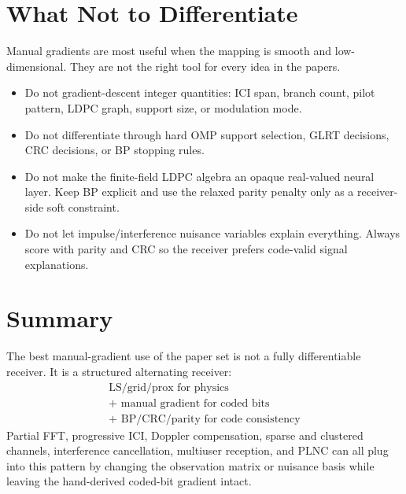 \documentclass[11pt]{article}
\begin{document}
\section{What Not to Differentiate}

Manual gradients are most useful when the mapping is smooth and low-dimensional.
They are not the right tool for every idea in the papers.

\begin{itemize}
  \item Do not gradient-descent integer quantities: ICI span, branch count,
  pilot pattern, LDPC graph, support size, or modulation mode.
  \item Do not differentiate through hard OMP support selection, GLRT decisions,
  CRC decisions, or BP stopping rules.
  \item Do not make the finite-field LDPC algebra an opaque real-valued neural
  layer.  Keep BP explicit and use the relaxed parity penalty only as a
  receiver-side soft constraint.
  \item Do not let impulse/interference nuisance variables explain everything.
  Always score with parity and CRC so the receiver prefers code-valid signal
  explanations.
\end{itemize}

\section{Summary}

The best manual-gradient use of the paper set is not a fully differentiable
receiver.  It is a structured alternating receiver:
\begin{equation}
  \boxed{
  \begin{gathered}
  \text{LS/grid/prox for physics}\\
  {}+\text{ manual gradient for coded bits}\\
  {}+\text{ BP/CRC/parity for code consistency}
  \end{gathered}
  }
\end{equation}
Partial FFT, progressive ICI, Doppler compensation, sparse and clustered
channels, interference cancellation, multiuser reception, and PLNC can all plug
into this pattern by changing the observation matrix or nuisance basis while
leaving the hand-derived coded-bit gradient intact.
\end{document}
